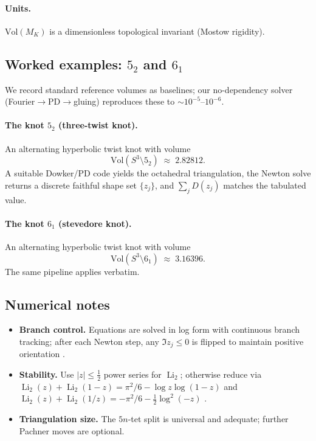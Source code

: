\documentclass[10pt,reprint,aps,onecolumn,nofootinbib]{revtex4-2}
\begin{document}
    \paragraph{Units.} \(\mathrm{Vol}(M_K)\) is a dimensionless topological invariant (Mostow rigidity).

\subsection{Worked examples: \(5_2\) and \(6_1\)}
We record standard reference volumes as baselines; our no-dependency solver (Fourier\(\to\)PD\(\to\)gluing) reproduces these to \(\sim10^{-5}\)–\(10^{-6}\).

\paragraph{The knot \(5_2\) (three-twist knot).}
    An alternating hyperbolic twist knot with volume
    \[
        \mathrm{Vol}(S^3\setminus 5_2)\;\approx\;2.82812.
    \]
    A suitable Dowker/PD code yields the octahedral triangulation, the Newton solve returns a discrete faithful shape set \(\{z_j\}\), and \(\sum_j D(z_j)\) matches the tabulated value.

\paragraph{The knot \(6_1\) (stevedore knot).}
    An alternating hyperbolic twist knot with volume
    \[
        \mathrm{Vol}(S^3\setminus 6_1)\;\approx\;3.16396.
    \]
    The same pipeline applies verbatim.

\subsection{Numerical notes}
\begin{itemize}
    \item \textbf{Branch control.} Equations are solved in log form with continuous branch tracking; after each Newton step, any \(\Im z_j\le0\) is flipped to maintain positive orientation \cite{NeumannZagier1985}.
    \item \textbf{Stability.} Use \(|z|\le\tfrac12\) power series for \(\operatorname{Li}_2\); otherwise reduce via
    \(\operatorname{Li}_2(z)+\operatorname{Li}_2(1-z)=\pi^2/6-\log z\log(1-z)\) and
    \(\operatorname{Li}_2(z)+\operatorname{Li}_2(1/z)=-\pi^2/6-\tfrac12\log^2(-z)\) \cite{Lewin1981}.
    \item \textbf{Triangulation size.} The \(5n\)‐tet split is universal and adequate; further Pachner moves are optional.
\end{itemize}
\end{document}
